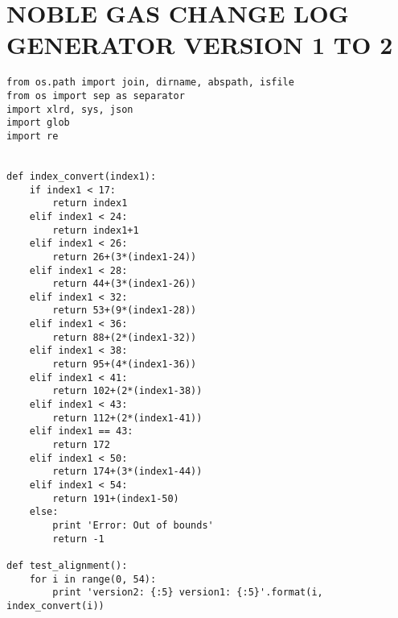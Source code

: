 
\appendix    %

\chapter{NOBLE GAS CHANGE LOG GENERATOR VERSION 1 TO 2} \label{app:noble12}
\begin{verbatim}
from os.path import join, dirname, abspath, isfile
from os import sep as separator
import xlrd, sys, json
import glob
import re


def index_convert(index1):
	if index1 < 17:
		return index1
	elif index1 < 24:
		return index1+1
	elif index1 < 26:
		return 26+(3*(index1-24))
	elif index1 < 28:
		return 44+(3*(index1-26))
	elif index1 < 32:
		return 53+(9*(index1-28))
	elif index1 < 36:
		return 88+(2*(index1-32))
	elif index1 < 38:
		return 95+(4*(index1-36))
	elif index1 < 41:
		return 102+(2*(index1-38))
	elif index1 < 43:
		return 112+(2*(index1-41))
	elif index1 == 43:
		return 172
	elif index1 < 50:
		return 174+(3*(index1-44))
	elif index1 < 54:
		return 191+(index1-50)
	else:
		print 'Error: Out of bounds'
		return -1

def test_alignment():
	for i in range(0, 54):
		print 'version2: {:5} version1: {:5}'.format(i, index_convert(i))


\end{verbatim}
